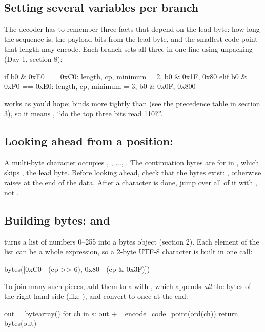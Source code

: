 \documentclass[10pt,a4paper]{article}
\begin{document}
\subsection{Setting several variables per branch}
The decoder has to remember three facts that depend on the lead byte: how long the sequence is, the payload bits from the lead byte, and the smallest code point that length may encode. Each branch sets all three in one line using unpacking (Day 1, section 8):
\begin{pycode}
if b0 & 0xE0 == 0xC0:
    length, cp, minimum = 2, b0 & 0x1F, 0x80
elif b0 & 0xF0 == 0xE0:
    length, cp, minimum = 3, b0 & 0x0F, 0x800
\end{pycode}
 works as you’d hope: \code{\&\allowbreak{}} binds more tightly than \code{=\allowbreak{}=\allowbreak{}} (see the precedence table in section 3), so it means , “do the top three bits read 110?”.
\subsection{Looking ahead from a position: }
A multi-byte character occupies , , ..., . The continuation bytes are  for  in , which skips , the lead byte. Before looking ahead, check that the bytes exist: , otherwise  raises  at the end of the data. After a character is done, jump over all of it with , not .
\subsection{Building bytes:  and }
 turns a list of numbers 0–255 into a bytes object (section 2). Each element of the list can be a whole expression, so a 2-byte UTF-8 character is built in one call:
\begin{pycode}
bytes([0xC0 | (cp >> 6), 0x80 | (cp & 0x3F)])
\end{pycode}
To join many such pieces, add them to a  with \code{+=\allowbreak{}}, which appends \emph{all} the bytes of the right-hand side (like ), and convert to  once at the end:
\begin{pycode}
out = bytearray()
for ch in s:
    out += encode_code_point(ord(ch))
return bytes(out)
\end{pycode}
\end{document}
